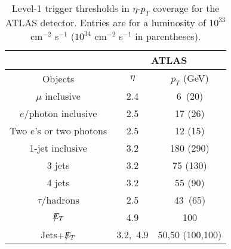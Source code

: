 \documentclass[prd,aps,floats,preprintnumbers,preprint,superscriptaddress,floatfix,nofootinbib]{revtex4}
\newcommand{ \slashchar }[1]{\setbox0=\hbox{$#1$}   %
   \dimen0=\wd0                                     %
   \setbox1=\hbox{/} \dimen1=\wd1                   %
   \ifdim\dimen0>\dimen1                            %
      \rlap{\hbox to \dimen0{\hfil/\hfil}}          %
      #1                                            %
   \else                                            %
      \rlap{\hbox to \dimen1{\hfil$#1$\hfil}}       %
      /                                             %
   \fi}                                             %
\def\etmiss{\slashchar{E}_{T}}
\def\pt{p_T^{}}
\begin{document}
%
%
\begin{table}[tb]
\begin{tabular}{|c|c c | } 
\hline
\multicolumn{1}{|c|}{ }&
\multicolumn{2}{c|}{ATLAS} \\
\hline
  Objects & $\eta$   & $\pt$ (GeV)  \\
\hline\hline
$\mu$ inclusive  &  2.4 &  6\ (20)     \\
\hline
$e$/photon inclusive & 2.5 &   17  (26) \\
Two $e$'s or two photons & 2.5 & 12 (15)    \\
\hline
1-jet inclusive  & 3.2  & 180 (290)  \\
3 jets  & 3.2  &    75 (130) \\
4 jets  & 3.2  &   55 (90)  \\
$\tau$/hadrons  & 2.5 & 43\ (65)   \\
\hline
$\etmiss$ & 4.9  & 100   \\
Jets$+\etmiss$ & 3.2,\ 4.9 & 50,50 (100,100)  \\
\hline
\end{tabular}
\caption{Level-1 trigger thresholds in $\eta$-$\pt$ coverage 
for the ATLAS  {\protect\cite{ATLAS}} detector.
Entries are for a luminosity of $10^{33}$ cm$^{-2}$ s$^{-1}$
($10^{34}$ cm$^{-2}$ s$^{-1}$ in parentheses). }
\label{trigger} 
\end{table}
\end{document}
